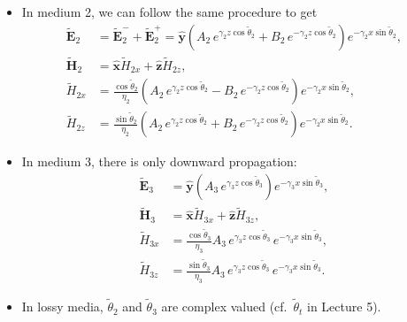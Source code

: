 \documentclass[11pt, oneside]{article}
\begin{document}
\begin{itemize}
	\item In medium 2, we can follow the same procedure to get
	\begin{align}
		\tilde{\mathbf{E}}_2 &= \tilde{\mathbf{E}}_2^- + \tilde{\mathbf{E}}_2^+ = \hat{\mathbf{y}}\left(A_2\,e^{\gamma_2z\cos\tilde{\theta}_2} + B_2\,e^{-\gamma_2z\cos\tilde{\theta}_2}\right)e^{-\gamma_2x\sin\tilde{\theta}_2}, \\
		\tilde{\mathbf{H}}_2 &= \hat{\mathbf{x}}\tilde{H}_{2x} + \hat{\mathbf{z}}\tilde{H}_{2z}, \\
		\tilde{H}_{2x} &= \frac{\cos\tilde{\theta}_2}{\eta_2}\left(A_2\,e^{\gamma_2z\cos\tilde{\theta}_2} - B_2\,e^{-\gamma_2z\cos\tilde{\theta}_2}\right)e^{-\gamma_2x\sin\tilde{\theta}_2}, \\
		\tilde{H}_{2z} &= \frac{\sin\tilde{\theta}_2}{\eta_2}\left(A_2\,e^{\gamma_2z\cos\tilde{\theta}_2} + B_2\,e^{-\gamma_2z\cos\tilde{\theta}_2}\right)e^{-\gamma_2x\sin\tilde{\theta}_2}.
	\end{align}
	\item In medium 3, there is only downward propagation:
	\begin{align}
		\tilde{\mathbf{E}}_3 &= \hat{\mathbf{y}}\left(A_3\,e^{\gamma_3z\cos\tilde{\theta}_3}\right)e^{-\gamma_3x\sin\tilde{\theta}_3}, \\
		\tilde{\mathbf{H}}_3 &= \hat{\mathbf{x}}\tilde{H}_{3x} + \hat{\mathbf{z}}\tilde{H}_{3z}, \\
		\tilde{H}_{3x} &= \frac{\cos\tilde{\theta}_3}{\eta_3}A_3\,e^{\gamma_3z\cos\tilde{\theta}_3}\,e^{-\gamma_3x\sin\tilde{\theta}_3}, \\
		\tilde{H}_{3z} &= \frac{\sin\tilde{\theta}_3}{\eta_3}A_3\,e^{\gamma_3z\cos\tilde{\theta}_3}\,e^{-\gamma_3x\sin\tilde{\theta}_3}.
	\end{align}
	\item In lossy media, $\tilde{\theta}_2$ and $\tilde{\theta}_3$ are complex valued (cf.\ $\tilde{\theta}_t$ in Lecture 5).
\end{itemize}
\end{document}
